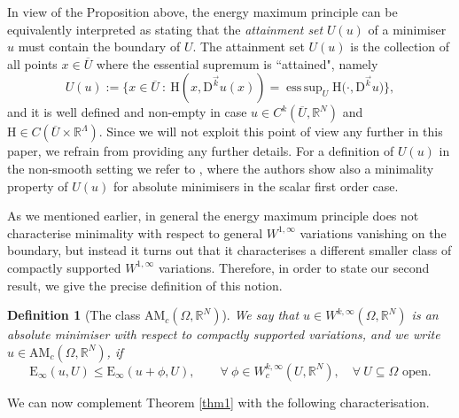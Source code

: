 \documentclass[a4paper,11pt]{article}
\numberwithin{equation}{section}
\newtheorem{Definition}[Theorem]{Definition}
\newcommand{\numberset}{\mathbb}
\newcommand{\Om}{\Omega}
\newcommand{\R}{\numberset{R}}
\newcommand{\rom}{\mathrm}
\DeclareMathOperator*{\esssup}{ess\,sup}
\theoremstyle{definition}
\begin{document}
In view of the Proposition above, the energy maximum principle can be equivalently interpreted as stating that the \textit{attainment set} $U(u)$ of a minimiser $u$ must contain the boundary of $U$. The attainment set $U(u)$ is the collection of all points $x\in \overline U$ where the essential supremum is ``attained", namely
\[
U(u) := \Big\{ x\in \overline U \ :  \ \rom{H}(x, \mathrm D ^{\vec{k}}u(x))=\esssup_U \rom{H}\big (\cdot,\mathrm D^{\vec{k}}u \big)\Big\},
\]
and it is well defined and non-empty in case $u\in C^k(\overline U,\R^N)$ and $\rom{H}\in C(\overline U\times\R^\Lambda)$. Since we will not exploit this point of view any further in this paper, we refrain from providing any further details. For a definition of $U(u)$ in the non-smooth setting we refer to \cite{BDP}, where the authors show also a minimality property of $U(u)$ for absolute minimisers in the scalar first order case.

As we mentioned earlier, in general the energy maximum principle does not characterise minimality with respect to general $W^{1,\infty}$ variations vanishing on the boundary, but instead it turns out that it characterises a different smaller class of compactly supported $W^{1,\infty}$ variations. Therefore, in order to state our second result, we give the precise definition of this notion. 

\begin{Definition}[The class $\mathrm {AM}_c(\Om,\R^N)$]

We say that $u\in W^{k,\infty}(\Om,\R^N)$ is an absolute minimiser with respect to  compactly supported variations, and we write $u\in \mathrm {AM}_c(\Om,\R^N)$, if
\begin{equation}\label{AM_c}
\mathrm E_\infty(u,U)\leq \mathrm E_\infty (u+\phi,U),\qquad\forall\  \phi\in W^{k,\infty}_c(U,\R^N),\quad\forall\  U\subseteq\Om\mbox{ open}.
\end{equation}
\end{Definition}

We can now complement Theorem \ref{thm1} with the following characterisation.
\end{document}
